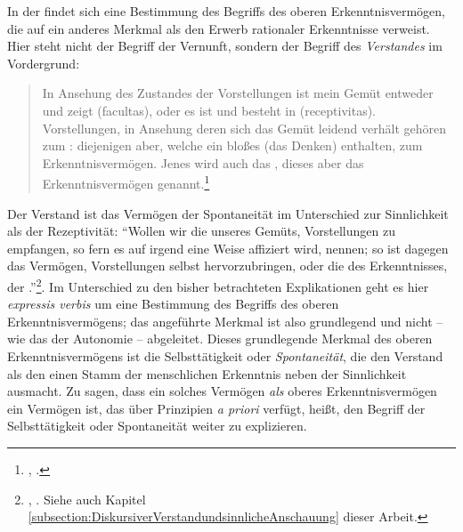 In der  findet sich eine
Bestimmung des Begriffs des oberen Erkenntnisvermögen, die auf ein anderes
Merkmal als den Erwerb rationaler Erkenntnisse verweist. Hier steht nicht der
Begriff der Vernunft, sondern der Begriff des \emph{Verstandes} im Vordergrund:
\begin{quote}
In Ansehung des Zustandes der Vorstellungen ist mein Gemüt entweder
 und zeigt  (facultas), oder es ist 
und besteht in  (receptivitas). {\punkt} Vorstellungen, in
Ansehung deren sich das Gemüt leidend verhält {\punkt} gehören zum
: diejenigen aber, welche ein bloßes  (das Denken)
enthalten, zum  Erkenntnisvermögen. Jenes wird auch das
, dieses aber das  Erkenntnisvermögen
genannt.\footnote{\cite[][BA 25]{Kant:AnthropologieinpragmatischerHinsicht1977},
\cite[][VII: 140.16--28]{Kant:GesammelteWerke1900ff.}.}
\end{quote}
Der Verstand ist das Vermögen der Spontaneität im Unterschied zur Sinnlichkeit
als der Rezeptivität: \enquote{Wollen wir die  unseres Gemüts,
Vorstellungen zu empfangen, so fern es auf irgend eine Weise affiziert wird,
 nennen; so ist dagegen das Vermögen, Vorstellungen selbst
hervorzubringen, oder die  des Erkenntnisses, der
.}\footnote{\cite[][B 75]{Kant:KritikderreinenVernunft2003},
\cite[][III: 75.5--8]{Kant:GesammelteWerke1900ff.}. Siehe auch Kapitel
\ref{subsection:DiskursiverVerstandundsinnlicheAnschauung} dieser Arbeit.}. Im
Unterschied zu den bisher betrachteten Explikationen geht es  hier
\emph{expressis verbis} um eine Bestimmung des Begriffs des oberen
Erkenntnisvermögens; das angeführte Merkmal ist also grundlegend und nicht --
wie das der Autonomie -- abgeleitet. Dieses grundlegende Merkmal des oberen
Erkenntnisvermögens ist die Selbsttätigkeit oder \emph{Spontaneität}, die den
Verstand als den einen Stamm der menschlichen Erkenntnis neben der Sinnlichkeit
ausmacht. Zu sagen, dass ein solches Vermögen \emph{als} oberes
Erkenntnisvermögen ein Vermögen ist, das über Prinzipien \emph{a priori}
verfügt, heißt, den Begriff der Selbsttätigkeit oder Spontaneität weiter zu
explizieren.

